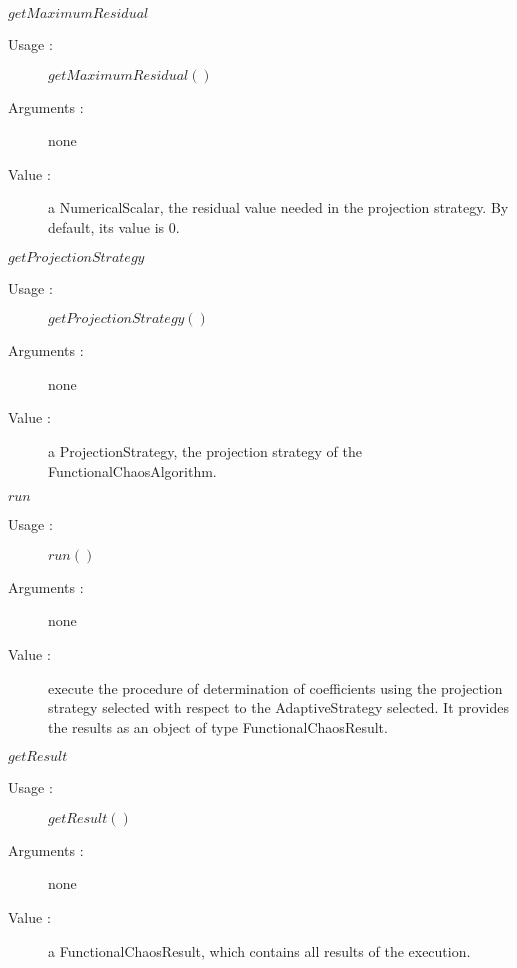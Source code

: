 \begin{description}
\item[Some methods :]  \rule{0pt}{1em}
  \begin{description}

  \item $getMaximumResidual$
    \begin{description}
    \item[Usage :] $getMaximumResidual()$
    \item[Arguments :] none
    \item[Value :] a NumericalScalar, the residual value needed in the projection strategy. By default, its value is 0.
    \end{description}
    \bigskip 



  \item $getProjectionStrategy$
    \begin{description}
    \item[Usage :] $getProjectionStrategy()$
    \item[Arguments :] none
    \item[Value :] a ProjectionStrategy, the projection strategy of the FunctionalChaosAlgorithm.
    \end{description}
    \bigskip


  \item $run$
    \begin{description}
    \item[Usage :] $run()$
    \item[Arguments :] none
    \item[Value :] execute the procedure of determination of coefficients using the projection strategy selected with respect to the AdaptiveStrategy selected. It provides the results as an object of type FunctionalChaosResult.
    \end{description}
    \bigskip
  \item $getResult$
    \begin{description}
    \item[Usage :] $getResult()$
    \item[Arguments :] none
    \item[Value :] a FunctionalChaosResult, which contains all results of the execution.
    \end{description}

  \end{description}

\end{description}



